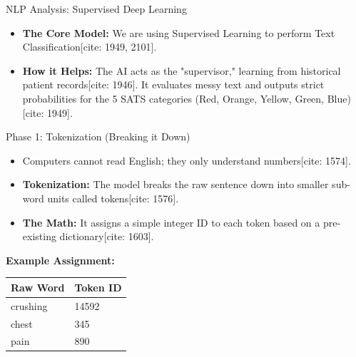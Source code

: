 \documentclass[10pt]{beamer}
\begin{document}
	\begin{frame}{NLP Analysis: Supervised Deep Learning}
		\begin{center}
		\end{center}
		
		\begin{itemize}
			\item \textbf{The Core Model:} We are using Supervised Learning to perform Text Classification[cite: 1949, 2101].
			\item \textbf{How it Helps:} The AI acts as the "supervisor," learning from historical patient records[cite: 1946]. It evaluates messy text and outputs strict probabilities for the 5 SATS categories (Red, Orange, Yellow, Green, Blue)[cite: 1949].
		\end{itemize}
	\end{frame}
	
	\begin{frame}{Phase 1: Tokenization (Breaking it Down)}
		\begin{itemize}
			\item Computers cannot read English; they only understand numbers[cite: 1574].
			\item \textbf{Tokenization:} The model breaks the raw sentence down into smaller sub-word units called tokens[cite: 1576].
			\item \textbf{The Math:} It assigns a simple integer ID to each token based on a pre-existing dictionary[cite: 1603].
		\end{itemize}
		
		\vspace{0.3cm}
		\textbf{Example Assignment:}
		\begin{table}[]
			\begin{tabular}{|l|l|}
				\hline
				\textbf{Raw Word} & \textbf{Token ID} \\ \hline
				crushing          & 14592             \\ \hline
				chest             & 345               \\ \hline
				pain              & 890               \\ \hline
			\end{tabular}
		\end{table}
	\end{frame}
	
\end{document}
